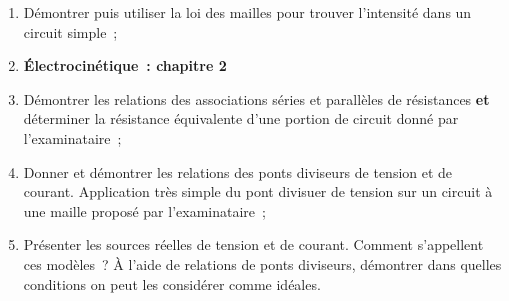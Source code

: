 \documentclass[a4paper, 12pt, final, garamond]{book}
\begin{document}
\begin{enumerate}
  \item Démontrer puis utiliser la loi des mailles pour trouver l'intensité
        dans un circuit simple~;
  \item[] \textbf{Électrocinétique~: chapitre 2}
  \item Démontrer les relations des associations séries et parallèles de
        résistances \textbf{et} déterminer la résistance équivalente d'une
        portion de circuit donné par l'examinataire~;
  \item Donner et démontrer les relations des ponts diviseurs de tension et de
        courant. Application très simple du pont divisuer de tension sur un
        circuit à une maille proposé par l'examinataire~;
  \item Présenter les sources réelles de tension et de courant. Comment
        s'appellent ces modèles~? À l'aide de relations de ponts diviseurs,
        démontrer dans quelles conditions on peut les considérer comme idéales.
\end{enumerate}
\end{document}
